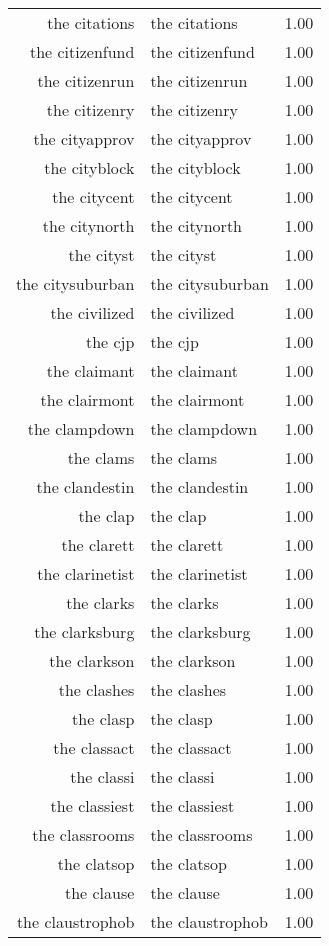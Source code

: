 \begin{table}[ht]
\begin{tabular}{rlr}
  the citations & the citations & 1.00 \\ 
  the citizenfund & the citizenfund & 1.00 \\ 
  the citizenrun & the citizenrun & 1.00 \\ 
  the citizenry & the citizenry & 1.00 \\ 
  the cityapprov & the cityapprov & 1.00 \\ 
  the cityblock & the cityblock & 1.00 \\ 
  the citycent & the citycent & 1.00 \\ 
  the citynorth & the citynorth & 1.00 \\ 
  the cityst & the cityst & 1.00 \\ 
  the citysuburban & the citysuburban & 1.00 \\ 
  the civilized & the civilized & 1.00 \\ 
  the cjp & the cjp & 1.00 \\ 
  the claimant & the claimant & 1.00 \\ 
  the clairmont & the clairmont & 1.00 \\ 
  the clampdown & the clampdown & 1.00 \\ 
  the clams & the clams & 1.00 \\ 
  the clandestin & the clandestin & 1.00 \\ 
  the clap & the clap & 1.00 \\ 
  the clarett & the clarett & 1.00 \\ 
  the clarinetist & the clarinetist & 1.00 \\ 
  the clarks & the clarks & 1.00 \\ 
  the clarksburg & the clarksburg & 1.00 \\ 
  the clarkson & the clarkson & 1.00 \\ 
  the clashes & the clashes & 1.00 \\ 
  the clasp & the clasp & 1.00 \\ 
  the classact & the classact & 1.00 \\ 
  the classi & the classi & 1.00 \\ 
  the classiest & the classiest & 1.00 \\ 
  the classrooms & the classrooms & 1.00 \\ 
  the clatsop & the clatsop & 1.00 \\ 
  the clause & the clause & 1.00 \\ 
  the claustrophob & the claustrophob & 1.00 \\ 

\end{tabular}
\end{table}
